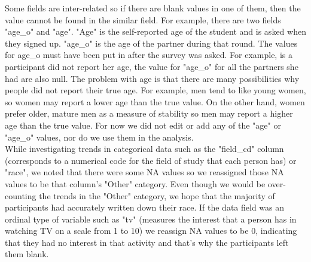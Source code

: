\documentclass{article}
\begin{document}

Some fields are inter-related so if there are blank values in one of them, then the value cannot be found in the similar field. For example, there are two fields "age\_o" and "age". "Age" is the self-reported age of the student and is asked when they signed up. "age\_o" is the age of the partner during that round.  The values for age\_o must have been put in after the survey was asked.  For example, is a participant did not report her age, the value for "age\_o" for all the partners she had are also null.  The problem with age is that there are many possibilities why people did not report their true age.  For example, men tend to like young women, so women may report a lower age than the true value.  On the other hand, women prefer older, mature men as a measure of stability so men may report a higher age than the true value.  For now we did not edit or add any of the "age" or "age\_o" values, nor do we use them in the analysis.\\

While investigating trends in categorical data such as the "field\_cd" column (corresponds to a numerical code for the field of study that each person has) or "race", we noted that there were some NA values  so we reassigned those NA values to be that column's "Other" category.  Even though we would be over-counting the trends in the "Other" category, we hope that the majority of participants had accurately written down their race.  If the data field was an ordinal type of variable such as "tv" (measures the interest that a person has in watching TV on a scale from 1 to 10) we reassign NA values to be 0, indicating that they had no interest in that activity and that's why the participants left them blank.\\
\end{document}
